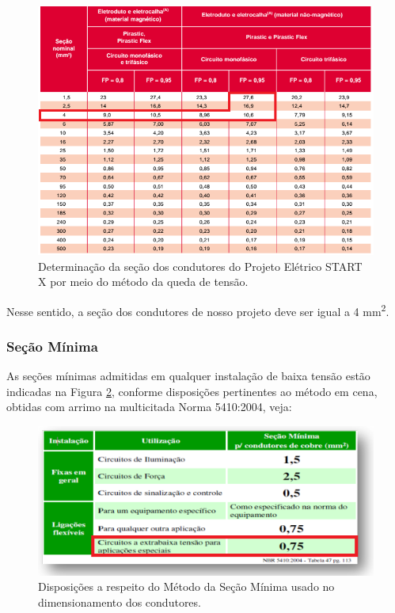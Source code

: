 \begin{figure}[h]
	\centering
	\includegraphics[scale=0.7]		{figuras/queda_tensao.png}
	\caption{ Determinação da seção dos condutores do Projeto Elétrico START X por meio do método da queda de tensão.}
	\label{determinacao-secao}
\end{figure}

Nesse sentido, a seção dos condutores de nosso projeto deve ser igual a 4 mm\textsuperscript{2}.

\subsubsection{Seção Mínima}

As seções mínimas admitidas em qualquer instalação de baixa tensão estão indicadas na Figura \ref{secao-minima-condutores}, conforme disposições pertinentes ao método em cena, obtidas com arrimo na multicitada Norma 5410:2004, veja:

\begin{figure}[h]
	\centering
	\includegraphics[scale=0.8]		{figuras/secao_minima.png}
	\caption{ Disposições a respeito do Método da Seção Mínima usado no dimensionamento dos condutores.}
	\label{secao-minima-condutores}
\end{figure}

